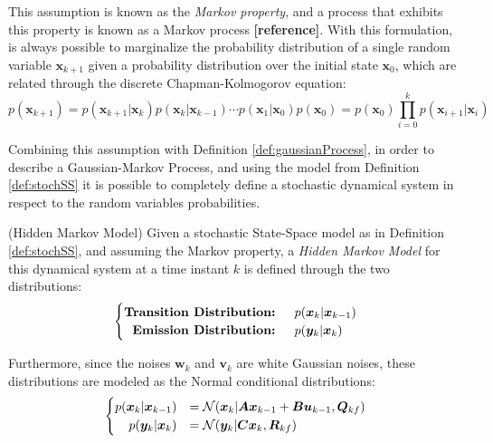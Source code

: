 \documentclass[a4paper,11pt]{book}
\numberwithin{figure}{chapter}
\numberwithin{equation}{chapter}
\numberwithin{table}{chapter}
\theoremstyle{definition}
\newtheorem{definition}{Definition}[chapter]
\newcounter{boxed-theorem}
\newcounter{boxed-definition}
\newenvironment{boxed-definition}[1]
{\begin{shaded} \begin{definition}{#1}}
{\end{definition} \end{shaded}}
\begin{document}
This assumption is known as the \textit{Markov property}, and a process that exhibits this property is known as a Markov process \textbf{[reference]}. With this formulation, is always possible to marginalize the probability distribution of a single random variable $\bm{x}_{k+1}$ given a probability distribution over the initial state $\bm{x}_0$, which are related through the discrete Chapman-Kolmogorov equation:
\begin{equation}
	p(\bm{x}_{k+1}) =  p(\bm{x}_{k+1} | \bm{x}_{k}) p(\bm{x}_{k} | \bm{x}_{k-1}) \cdots p(\bm{x}_{1} | \bm{x}_{0})p(\bm{x}_0) = p(\bm{x}_0) \prod_{i=0}^k p(\bm{x}_{i+1} | \bm{x}_{i})
\end{equation}


Combining this assumption with Definition \ref{def:gaussianProcess}, in order to describe a Gaussian-Markov Process, and using the model from Definition \ref{def:stochSS} it is possible to completely define a stochastic dynamical system in respect to the random variables probabilities.

\begin{boxed-definition}{(Hidden Markov Model)} \label{def:HMM}
	Given a stochastic State-Space model as in Definition \ref{def:stochSS}, and assuming the Markov property, a \textit{Hidden Markov Model} for this dynamical system at a time instant $k$ is defined through the two distributions:
	\begin{align}
	\begin{cases}
		\textbf{Transition Distribution: } & p(\bm{x}_{k} | \bm{x}_{k-1}) \\
		\hfill \textbf{Emission Distribution: } & p(\bm{y}_{k} | \bm{x}_{k})
	\end{cases}
	\end{align}
	
	Furthermore, since the noises $\bm{w}_k$ and $\bm{v}_k$ are white Gaussian noises, these distributions are modeled as the Normal conditional distributions:
	\begin{align}
	\begin{cases}
		p(\bm{x}_{k} | \bm{x}_{k-1}) &= \mathcal{N}(\bm{x}_k | \bm{A}\bm{x}_{k-1} + \bm{B}\bm{u}_{k-1}, \bm{Q}_{kf}) \\
		\hfill p(\bm{y}_{k} | \bm{x}_{k}) &= \mathcal{N}(\bm{y}_k | \bm{C}\bm{x}_{k}, \bm{R}_{kf})
	\end{cases}
	\end{align}
\end{boxed-definition}
\end{document}
